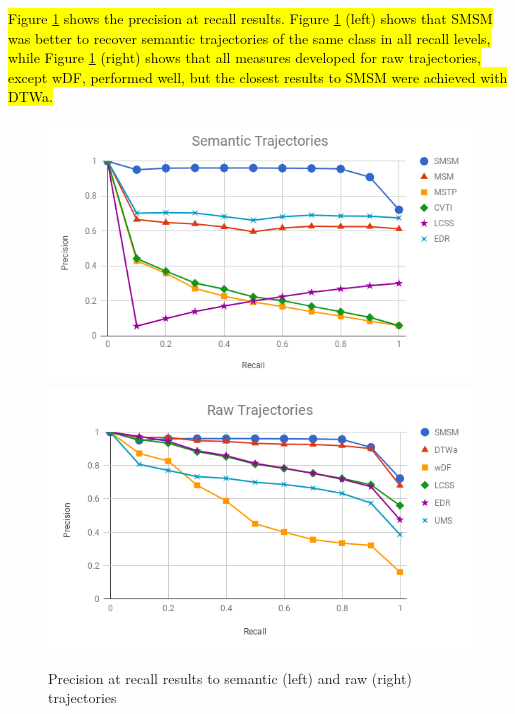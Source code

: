 \documentclass[12pt]{article}
\begin{document}
\hl{Figure {\ref{fig:geolife_precision_recall}} shows the precision at recall results. Figure {\ref{fig:geolife_precision_recall}} (left) shows that SMSM was better to recover semantic trajectories of the same class in all recall levels, while Figure {\ref{fig:geolife_precision_recall}} (right) shows that all measures developed for raw trajectories, except wDF, performed well, but  the closest results to SMSM were achieved with DTWa.}


\begin{figure}[ht!]
\centerline{
\centering
\includegraphics[width=.55\textwidth]{Images/new_P_R-chart_Geolife.png}
\includegraphics[width=.55\textwidth]{Images/new_P_R-chart_Geolife-raw.png}
}
\caption{Precision at recall results to semantic (left) and raw (right) trajectories}
\label{fig:geolife_precision_recall}
\end{figure}
\end{document}
